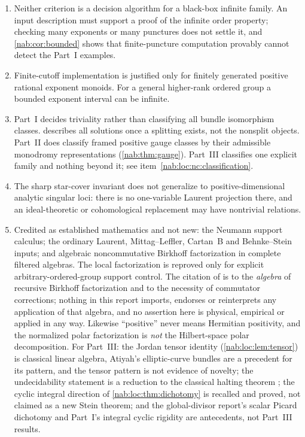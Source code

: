 \documentclass[11pt,letterpaper]{article}
\theoremstyle{definition}
\theoremstyle{remark}
\numberwithin{equation}{section}
\begin{document}
\begin{enumerate}
\item\label{nab:nc:blackbox}
Neither criterion is a decision algorithm for a black-box infinite family. An
input description must support a proof of the infinite order property;
checking many exponents or many punctures does not settle it, and
\cref{nab:cor:bounded} shows that finite-puncture computation provably cannot
detect the Part~I examples.

\item\label{nab:nc:truncation}
Finite-cutoff implementation is justified only for finitely generated positive
rational exponent monoids. For a general higher-rank ordered group a bounded
exponent interval can be infinite.

\item\label{nab:nc:classification}
Part~I decides triviality rather than classifying all bundle isomorphism
classes.  describes all solutions once a splitting
exists, not the nonsplit objects. Part~II does classify framed positive gauge
classes by their admissible monodromy representations
(\cref{nab:thm:gauge}). Part~III classifies one explicit family and nothing
beyond it; see item~\ref{nab:loc:nc:classification}.

\item\label{nab:nc:higherdim}
The sharp star-cover invariant does not generalize to positive-dimensional
analytic singular loci: there is no one-variable Laurent projection there, and
an ideal-theoretic or cohomological replacement may have nontrivial relations.

\item\label{nab:nc:credits}
Credited as established mathematics and not new: the Neumann support calculus;
the ordinary Laurent, Mittag--Leffler, Cartan~B and Behnke--Stein inputs; and
algebraic noncommutative Birkhoff factorization in complete filtered algebras.
The local factorization is reproved only for explicit arbitrary-ordered-group
support control. The citation of \cite{EFGK} is to the \emph{algebra} of
recursive Birkhoff factorization and to the necessity of commutator
corrections; nothing in this report imports, endorses or reinterprets any
application of that algebra, and no assertion here is physical, empirical or
applied in any way. Likewise ``positive'' never means Hermitian positivity,
and the normalized polar factorization is \emph{not} the Hilbert-space polar
decomposition. For Part~III: the Jordan tensor identity
(\cref{nab:loc:lem:tensor}) is classical linear algebra, Atiyah's
elliptic-curve bundles \cite{Atiyah} are a precedent for its pattern, and the
tensor pattern is not evidence of novelty; the undecidability statement is a
reduction to the classical halting theorem \cite{Turing}; the cyclic integral
direction of \cref{nab:loc:thm:dichotomy} is recalled and proved, not claimed
as a new Stein theorem; and the global-divisor report's scalar Picard
dichotomy and Part~I's integral cyclic rigidity are antecedents, not Part~III
results.


\end{enumerate}
\end{document}
